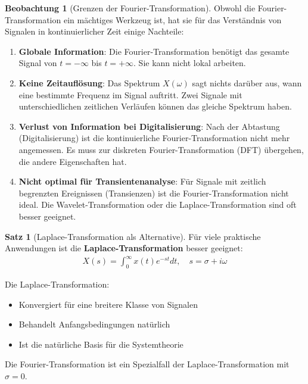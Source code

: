 ﻿\documentclass[a4paper,12pt]{report}
\theoremstyle{definition}
\newtheorem{satz}{Satz}
\newtheorem{beobachtung}{Beobachtung}
\begin{document}
	\begin{beobachtung}[Grenzen der Fourier-Transformation]
		
		Obwohl die Fourier-Transfor\-mation ein mächtiges Werkzeug ist, hat sie für das Verständnis von Signalen in kontinuierlicher Zeit einige Nachteile:
		
		\begin{enumerate}
			\item[-] \textbf{Globale Information}: Die Fourier-Transformation benötigt das gesamte Signal von $t = -\infty$ bis $t = +\infty$. Sie kann nicht lokal arbeiten.
			
			\item[-] \textbf{Keine Zeitauflösung}: Das Spektrum $X(\omega)$ sagt nichts darüber aus, wann eine bestimmte Frequenz im Signal auftritt. Zwei Signale mit unterschiedlichen zeitlichen Verläufen können das gleiche Spektrum haben.
			
			\item[-] \textbf{Verlust von Information bei Digitalisierung}: Nach der Abtastung (Digitalisierung) ist die kontinuierliche Fourier-Transformation nicht mehr angemessen. Es muss zur diskreten Fourier-Transformation (DFT) übergehen, die andere Eigenschaften hat.
			
			\item[-] \textbf{Nicht optimal für Transientenanalyse}: Für Signale mit zeitlich begrenzten Ereignissen (Transienzen) ist die Fourier-Transformation nicht ideal. Die Wavelet-Transformation oder die Laplace-Transformation sind oft besser geeignet.
		\end{enumerate}
	\end{beobachtung}
	
	\begin{satz}[Laplace-Transformation als Alternative]
		Für viele praktische Anwendungen ist die \textbf{Laplace-Transformation} besser geeignet:
		\begin{align}
			X(s) = \int_0^{\infty} x(t) e^{-st} dt, \quad s = \sigma + i\omega
		\end{align}
		
		Die Laplace-Transformation:
		\begin{itemize}
			\item[-] Konvergiert für eine breitere Klasse von Signalen
			\item[-] Behandelt Anfangsbedingungen natürlich
			\item[-] Ist die natürliche Basis für die Systemtheorie
		\end{itemize}
		
		Die Fourier-Transformation ist ein Spezialfall der Laplace-Transformation mit $\sigma = 0$.
	\end{satz}
	
\end{document}
